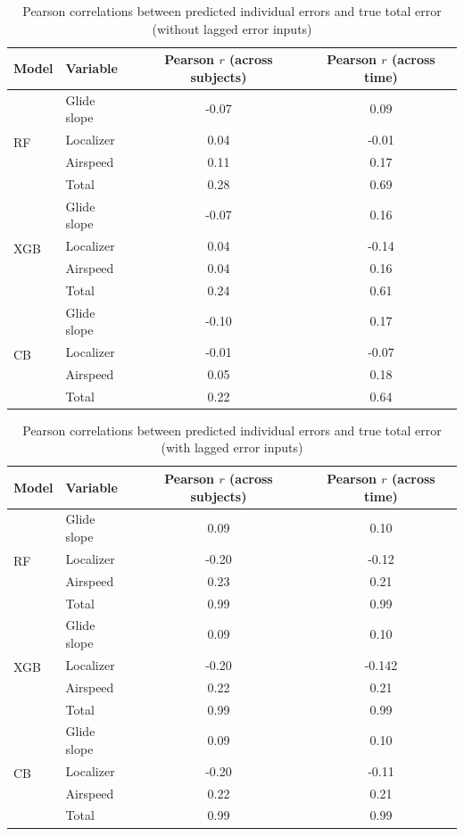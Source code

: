 \documentclass[11pt, a4paper]{article}
\begin{document}
\begin{table}[htbp]
	\caption{Pearson correlations between predicted individual errors and true total error (without lagged error inputs)}
	\label{tab:corr_pred_total_no_lag}
	\centering
	\small
	\begin{tabular}{llcc}
		\toprule
		                     
		Model     & Variable  & Pearson $r$ (across subjects)	& Pearson $r$ (across time)   \\ 
		\midrule
		\multirow{4}{*}{RF}  	&Glide slope  	& -0.07 & 0.09 	\\
								&Localizer		& 0.04	& -0.01	 \\
								&Airspeed		& 0.11	& 0.17	\\
								&Total			& 0.28	&0.69	\\	
		\midrule
		\multirow{4}{*}{XGB}    & Glide slope 	&-0.07   	& 0.16\\
								& Localizer 	& 0.04 		& -0.14\\
								& Airspeed 		& 0.04  	& 0.16\\
								& Total 		& 0.24 		& 0.61\\
		\midrule
		\multirow{4}{*}{CB}  	& Glide slope 	&-0.10   & 0.17\\
								& Localizer 	& -0.01 & -0.07\\
								& Airspeed 		& 0.05  & 0.18\\
								& Total 		& 0.22 & 0.64\\
		\bottomrule
	\end{tabular}
\end{table}

\begin{table}[htbp]
	\caption{Pearson correlations between predicted individual errors and true total error (with lagged error inputs)}
	\label{tab:corr_pred_total_lag}
	\centering
	\small
	\begin{tabular}{llcc}
		\toprule
		
		Model     & Variable  & Pearson $r$ (across subjects)	& Pearson $r$ (across time)   \\ 
		\midrule
		\multirow{4}{*}{RF}  	&Glide slope  	& 0.09 & 0.10 	\\
								&Localizer		& -0.20	& -0.12	 \\
								&Airspeed		& 0.23	& 0.21	\\
								&Total			& 0.99	&0.99	\\	
		\midrule
		\multirow{4}{*}{XGB}    & Glide slope 	&0.09   	& 0.10\\
								& Localizer 	&-0.20 		& -0.142\\
								& Airspeed 		& 0.22  	& 0.21\\
								& Total 		& 0.99 		& 0.99\\
		\midrule
		\multirow{4}{*}{CB}  	& Glide slope 	&0.09   & 0.10\\
								& Localizer 	& -0.20 & -0.11\\
								& Airspeed 		& 0.22  & 0.21\\
								& Total 		& 0.99 & 0.99\\
		\bottomrule
	\end{tabular}
\end{table}
\end{document}
